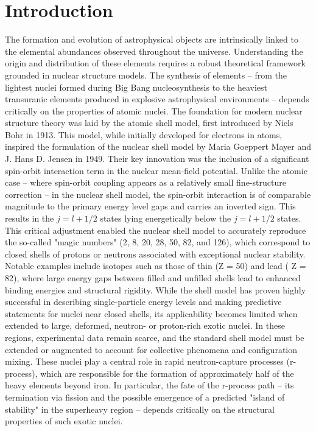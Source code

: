 \section{Introduction}
The formation and evolution of astrophysical objects are intrinsically linked to the elemental abundances observed throughout the universe. Understanding the origin and distribution of these elements requires a robust theoretical framework grounded in nuclear structure models. The synthesis of elements -- from the lightest nuclei formed during Big Bang nucleosynthesis to the heaviest transuranic elements produced in explosive astrophysical environments -- depends critically on the properties of atomic nuclei.\newline
The foundation for modern nuclear structure theory was laid by the atomic shell model, first introduced by Niels Bohr in 1913. This model, while initially developed for electrons in atoms, inspired the formulation of the nuclear shell model by Maria Goeppert Mayer and J. Hans D. Jensen in 1949. Their key innovation was the inclusion of a significant spin-orbit interaction term in the nuclear mean-field potential. Unlike the atomic case -- where spin-orbit coupling appears as a relatively small fine-structure correction -- in the nuclear shell model, the spin-orbit interaction is of comparable magnitude to the primary energy level gaps and carries an inverted sign. This results in the $j = l + 1/2$ states lying energetically below the $j = l + 1/2$  states.\newline
This critical adjustment enabled the nuclear shell model to accurately reproduce the so-called "magic numbers" (2, 8, 20, 28, 50, 82, and 126), which correspond to closed shells of protons or neutrons associated with exceptional nuclear stability. Notable examples include isotopes such as those of thin (Z = 50) and  lead ( Z = 82), where large energy gaps between filled and unfilled shells lead to enhanced binding energies and structural rigidity.\newline
While the shell model has proven highly successful in describing single-particle energy levels and making predictive statements for nuclei near closed shells, its applicability becomes limited when extended to large, deformed, neutron- or proton-rich exotic nuclei. In these regions, experimental data remain scarce, and the standard shell model must be extended or augmented to account for collective phenomena and configuration mixing. These nuclei play a central role in rapid neutron-capture processes (r-process), which are responsible for the formation of approximately half of the heavy elements beyond iron. In particular, the fate of the r-process path -- its termination via fission and the possible emergence of a predicted "island of stability" in the superheavy region -- depends critically on the structural properties of such exotic nuclei.\newline
